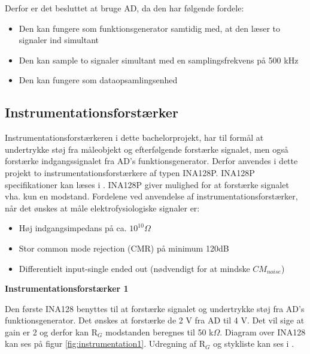 Derfor er det besluttet at bruge AD, da den har følgende fordele:
\begin{itemize}
\item Den kan fungere som funktionsgenerator samtidig med, at den læser to signaler ind simultant
\item Den kan sample to signaler simultant med en samplingsfrekvens på 500 kHz
\item Den kan fungere som dataopsamlingsenhed
\end{itemize}



\subsection{Instrumentationsforstærker}

Instrumentationsforstærkeren i dette bachelorprojekt, har til formål at undertrykke støj fra måleobjekt og efterfølgende forstærke signalet, men også forstærke indgangssignalet fra AD's funktionsgenerator. Derfor anvendes i dette
projekt to instrumentationsforstærkere af typen INA128P. INA128P specifikationer kan læses i . INA128P giver mulighed for at forstærke signalet vha. kun en modstand. Fordelene ved anvendelse af instrumentationsforstærker, når det ønskes at måle elektrofysiologiske signaler er\cite{PeterJohansen2014}:
\begin{itemize}
\item 	Høj indgangsimpedans på ca. $10^{10} \Omega $
\item	Stor common mode rejection (CMR) på minimum 120dB
\item 	Differentielt input-single ended out (nødvendigt for at mindske $CM_{noise}$)
\end{itemize}



\textbf{Instrumentationsforstærker 1}

Den første INA128 benyttes til at forstærke signalet og undertrykke støj fra AD's funktionsgenerator. Det ønskes at forstærke de 2 V fra AD til 4 V. Det vil sige at gain er 2 og derfor kan R$_{G}$ modstanden beregnes til 50 k$\Omega$. Diagram over INA128 kan ses på figur \ref{fig:instrumentation1}. Udregning af R$_{G}$ og stykliste kan ses i .


